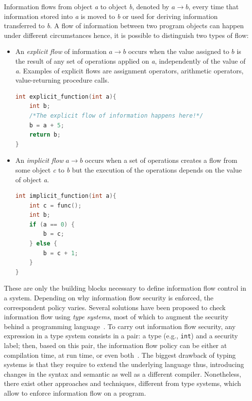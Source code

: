 \documentclass[LaM,binding=0.6cm]{sapthesis}
\begin{document}
Information flows from object \textit{a} to object \textit{b}, denoted by $a \rightarrow b$, every time that information stored into \textit{a} is moved to \textit{b} or used for deriving information transferred to \textit{b}. A flow of information between two program objects can happen under different circumstances hence, it is possible to distinguish two types of flow:
\begin{itemize}
\item An \textit{explicit flow} of information $a \rightarrow b$ occurs when the value assigned to $b$ is the result of any set of operations applied on \textit{a}, independently of the value of \textit{a}. Examples of explicit flows are assignment operators, arithmetic operators, value-returning procedure calls.
\begin{lstlisting}[language=C++, caption=Example of explicit flow where the value of variable \texttt{b} is the result of an addition operation involving variable \texttt{a}.]
int explicit_function(int a){
	int b;
	/*The explicit flow of information happens here!*/
	b = a + 5;
	return b;
}
\end{lstlisting}
\item An \textit{implicit flow} $a \rightarrow b$ occurs when a set of operations creates a flow from some object \textit{c} to \textit{b} but the execution of the operations depends on the value of object \textit{a}.
\begin{lstlisting}[language=C++, caption=Example of implicit flow where the value assumed by variable \texttt{b} depends on the actual value of variable \texttt{a}.]
int implicit_function(int a){
	int c = func();
	int b;
	if (a == 0) {
		b = c;
	} else {
		b = c + 1;
	}
}
\end{lstlisting}
\end{itemize}
These are only the building blocks necessary to define information flow control in a system. Depending on why information flow security is enforced, the correspondent policy varies. Several solutions have been proposed to check information flow using \textit{type systems}, most of which to augment the security behind a programming language~\cite{malecha2010more}. To carry out information flow security, any expression in a type system consists in a pair: a type (e.g., \texttt{int}) and a security label; then, based on this pair, the information flow policy can be either at compilation time, at run time, or even both~\cite{sabelfeld2003language}.
\newpage
The biggest drawback of typing systems is that they require to extend the underlying language thus, introducing changes in the syntax and semantic as well as a different compiler. Nonetheless, there exist other approaches and techniques, different from type systems, which allow to enforce information flow on a program.
\end{document}
